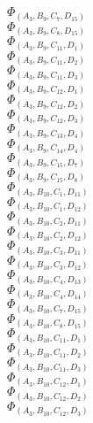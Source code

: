 \documentclass[14pt]{article}
\begin{document}
    $\Phi_{({A}_{3}, {B}_{9}, {C}_{7}, {D}_{15})}$ \\ 
    $\Phi_{({A}_{3}, {B}_{9}, {C}_{8}, {D}_{15})}$ \\ 
    $\Phi_{({A}_{3}, {B}_{9}, {C}_{11}, {D}_{1})}$ \\ 
    $\Phi_{({A}_{3}, {B}_{9}, {C}_{11}, {D}_{2})}$ \\ 
    $\Phi_{({A}_{3}, {B}_{9}, {C}_{11}, {D}_{3})}$ \\ 
    $\Phi_{({A}_{3}, {B}_{9}, {C}_{12}, {D}_{1})}$ \\ 
    $\Phi_{({A}_{3}, {B}_{9}, {C}_{12}, {D}_{2})}$ \\ 
    $\Phi_{({A}_{3}, {B}_{9}, {C}_{12}, {D}_{3})}$ \\ 
    $\Phi_{({A}_{3}, {B}_{9}, {C}_{13}, {D}_{4})}$ \\ 
    $\Phi_{({A}_{3}, {B}_{9}, {C}_{14}, {D}_{4})}$ \\ 
    $\Phi_{({A}_{3}, {B}_{9}, {C}_{15}, {D}_{7})}$ \\ 
    $\Phi_{({A}_{3}, {B}_{9}, {C}_{15}, {D}_{8})}$ \\ 
    $\Phi_{({A}_{3}, {B}_{10}, {C}_{1}, {D}_{11})}$ \\ 
    $\Phi_{({A}_{3}, {B}_{10}, {C}_{1}, {D}_{12})}$ \\ 
    $\Phi_{({A}_{3}, {B}_{10}, {C}_{2}, {D}_{11})}$ \\ 
    $\Phi_{({A}_{3}, {B}_{10}, {C}_{2}, {D}_{12})}$ \\ 
    $\Phi_{({A}_{3}, {B}_{10}, {C}_{3}, {D}_{11})}$ \\ 
    $\Phi_{({A}_{3}, {B}_{10}, {C}_{3}, {D}_{12})}$ \\ 
    $\Phi_{({A}_{3}, {B}_{10}, {C}_{4}, {D}_{13})}$ \\ 
    $\Phi_{({A}_{3}, {B}_{10}, {C}_{4}, {D}_{14})}$ \\ 
    $\Phi_{({A}_{3}, {B}_{10}, {C}_{7}, {D}_{15})}$ \\ 
    $\Phi_{({A}_{3}, {B}_{10}, {C}_{8}, {D}_{15})}$ \\ 
    $\Phi_{({A}_{3}, {B}_{10}, {C}_{11}, {D}_{1})}$ \\ 
    $\Phi_{({A}_{3}, {B}_{10}, {C}_{11}, {D}_{2})}$ \\ 
    $\Phi_{({A}_{3}, {B}_{10}, {C}_{11}, {D}_{3})}$ \\ 
    $\Phi_{({A}_{3}, {B}_{10}, {C}_{12}, {D}_{1})}$ \\ 
    $\Phi_{({A}_{3}, {B}_{10}, {C}_{12}, {D}_{2})}$ \\ 
    $\Phi_{({A}_{3}, {B}_{10}, {C}_{12}, {D}_{3})}$ \\ 
\end{document}
